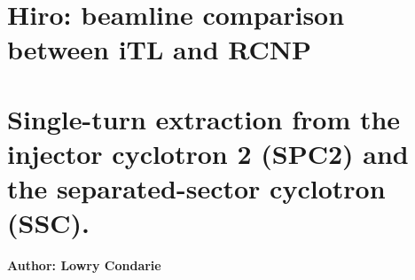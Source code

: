 \documentclass[11pt]{report}
\begin{document}


\chapter{Hiro: beamline comparison between iTL and RCNP}

\begin{figure}[!ht]
\centerline{\vspace{0cm}\hspace{0cm}
}
\centering
\end{figure} 

\begin{figure}[!ht]
\centerline{\vspace{0cm}\hspace{0cm}
}
\centering
\end{figure} 

\begin{figure}[!ht]
\centerline{\vspace{0cm}\hspace{0cm}
}
\centering
\end{figure} 


\chapter{Single-turn extraction from the injector cyclotron 2 (SPC2) and the separated-sector cyclotron (SSC).}

{\bf Author: Lowry Condarie}
\end{document}
